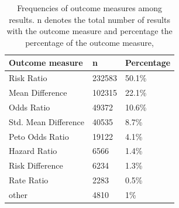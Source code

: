 \documentclass[11pt,a4paper,twoside]{book}\usepackage[]{graphicx}\usepackage[]{color}
\begin{document}
\begin{table}[ht]
\centering
\begingroup\footnotesize
\begin{tabular}{lll}
  \hline
Outcome measure & n & Percentage \\ 
  \hline
Risk Ratio & 232583 & 50.1\% \\ 
  Mean Difference & 102315 & 22.1\% \\ 
  Odds Ratio & 49372 & 10.6\% \\ 
  Std. Mean Difference & 40535 & 8.7\% \\ 
  Peto Odds Ratio & 19122 & 4.1\% \\ 
  Hazard Ratio & 6566 & 1.4\% \\ 
  Risk Difference & 6234 & 1.3\% \\ 
  Rate Ratio & 2283 & 0.5\% \\ 
  other & 4810 & 1\% \\ 
   \hline
\end{tabular}
\endgroup
\caption{Frequencies of outcome measures among results. n denotes the total number 
             of results with the outcome measure and percentage the percentage of the outcome measure,} 
\label{outcome.measure.frequencies}
\end{table}
\end{document}
